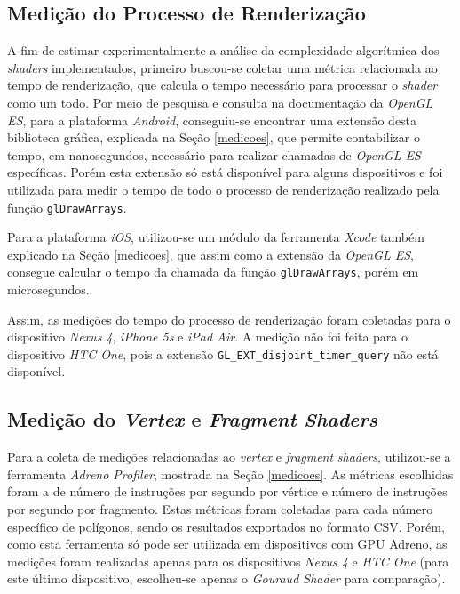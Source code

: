 \subsection{Medição do Processo de Renderização}
\label{gpu}

	A fim de estimar experimentalmente a análise da complexidade algorítmica dos \textit{shaders} implementados, primeiro buscou-se coletar uma métrica relacionada ao tempo de renderização, que calcula o tempo necessário para processar o \textit{shader} como um todo. Por meio de pesquisa e consulta na documentação da \textit{OpenGL ES}, para a plataforma \textit{Android}, conseguiu-se encontrar uma extensão desta biblioteca gráfica, explicada na Seção \ref{medicoes}, que permite contabilizar o tempo, em nanosegundos, necessário para realizar chamadas de \textit{OpenGL ES} específicas. Porém esta extensão só está disponível para alguns dispositivos e foi utilizada para medir o tempo de todo o processo de renderização realizado pela função \texttt{glDrawArrays}.

	Para a plataforma \textit{iOS}, utilizou-se um módulo da ferramenta \textit{Xcode} também explicado na Seção \ref{medicoes}, que assim como a extensão da \textit{OpenGL ES}, consegue calcular o tempo da chamada da função \texttt{glDrawArrays}, porém em microsegundos.  

	Assim, as medições do tempo do processo de renderização foram coletadas para o dispositivo \textit{Nexus 4}, \textit{iPhone 5s} e \textit{iPad Air}. A medição não foi feita para o dispositivo \textit{HTC One}, pois a extensão \texttt{GL\_EXT\_disjoint\_timer\_query} não está disponível.

\subsection{Medição do \textit{Vertex} e  \textit{Fragment Shaders}}

	Para a coleta de medições relacionadas ao \textit{vertex} e \textit{fragment} \textit{shaders}, utilizou-se a ferramenta \textit{Adreno Profiler}, mostrada na Seção \ref{medicoes}. As métricas escolhidas foram a de número de instruções por segundo por vértice e número de instruções por segundo por fragmento. Estas métricas foram coletadas para cada número específico de polígonos, sendo os resultados exportados no formato CSV. Porém, como esta ferramenta só pode ser utilizada em dispositivos com GPU Adreno, as medições foram realizadas apenas para os dispositivos \textit{Nexus 4} e \textit{HTC One} (para este último dispositivo, escolheu-se apenas o \textit{Gouraud Shader} para comparação). 

